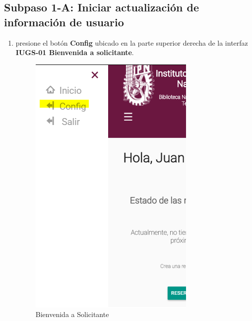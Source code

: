 \subsection{Subpaso 1-A: Iniciar actualización de información de usuario}
\begin{enumerate}
	\item presione el botón \textbf{Config} ubicado en la parte 
		superior derecha de la interfaz
		\textbf{IUGS-01 Bienvenida a solicitante}.
		
		\begin{figure}[hbtp]
		
		\includegraphics[scale=0.3]{images/InterfazMovil/IUGS08_bienvenida.png}
		\caption{Bienvenida a Solicitante}
	\end{figure}
\end{enumerate}

	